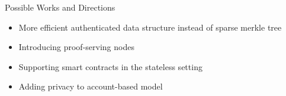 \documentclass[biblatex,aspectratio=169,11pt]{mybeamer}
\begin{document}
\begin{frame}{Possible Works and Directions}
  \begin{itemize}[<+->]
    \item More efficient authenticated data structure instead of sparse merkle tree
    \item Introducing proof-serving nodes
    \item Supporting smart contracts in the stateless setting
    \item Adding privacy to account-based model
  \end{itemize}
\end{frame}

\nocite{*}
\PrintRef%
\PrintQA%
\end{document}
